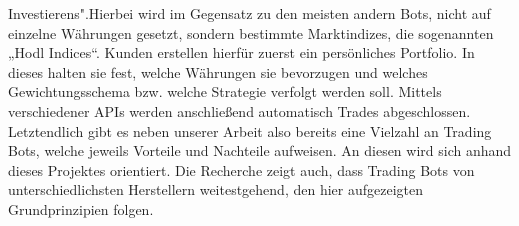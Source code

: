 \documentclass[sigconf]{acmart}
\begin{document}
Investierens".\newline Hierbei wird im Gegensatz zu den meisten andern Bots, nicht auf einzelne Währungen
gesetzt, sondern bestimmte Marktindizes, die sogenannten „Hodl Indices“. Kunden erstellen hierfür
zuerst ein persönliches Portfolio. In dieses halten sie fest, welche Währungen sie bevorzugen und
welches Gewichtungsschema bzw. welche Strategie verfolgt werden soll. Mittels verschiedener APIs
werden anschließend automatisch Trades abgeschlossen.\newline
Letztendlich gibt es neben unserer Arbeit also bereits eine Vielzahl an Trading Bots, welche jeweils
Vorteile und Nachteile aufweisen. An diesen wird sich anhand dieses Projektes orientiert. Die
Recherche zeigt auch, dass Trading Bots von unterschiedlichsten Herstellern weitestgehend, den hier
aufgezeigten Grundprinzipien folgen.










\listoffigures
\end{document}
